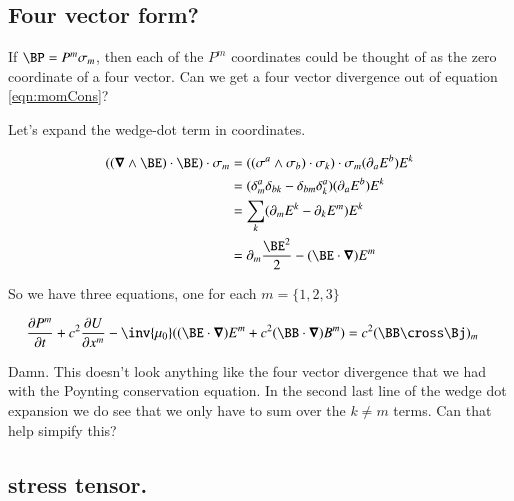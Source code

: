 \documentclass{article}
\begin{document}
%
%

\subsection{ Four vector form? }

If $\BP = P^m \sigma_m$, then each of the $P^m$ coordinates could be thought of as the zero coordinate of a four vector.  Can we get a four vector
divergence out of equation \ref{eqn:momCons}?

Let's expand the wedge-dot term in coordinates.

\begin{align*}
( (\spacegrad \wedge \BE ) \cdot \BE ) \cdot \sigma_m
&= ((\sigma^a \wedge \sigma_b) \cdot \sigma_k ) \cdot \sigma_m (\partial_a E^b) E^k \\
&= (\delta^a_m \delta_{bk} - \delta_{bm} \delta^a_k) (\partial_a E^b) E^k \\
&= \sum_k (\partial_m E^k - \partial_k E^m) E^k \\
&= \partial_m \frac{\BE^2}{2} - (\BE \cdot \spacegrad) E^m \\
\end{align*}

So we have three equations, one for each $m = \{1,2,3\}$

\begin{align}\label{eqn:coordinates}
\PD{t}{P^m} + c^2 \PD{x^m}{U} - \inv{\mu_0}( (\BE \cdot \spacegrad) E^m + c^2 (\BB \cdot \spacegrad) B^m ) &= c^2 (\BB \cross \Bj)_m
\end{align}

Damn.  This doesn't look anything like the four vector divergence that we had with the Poynting conservation equation.  In the second last line 
of the wedge dot expansion we do see that we only have to sum over the $k \ne m$ terms.  Can that help simpify this?

\subsection{ stress tensor. }
\end{document}
